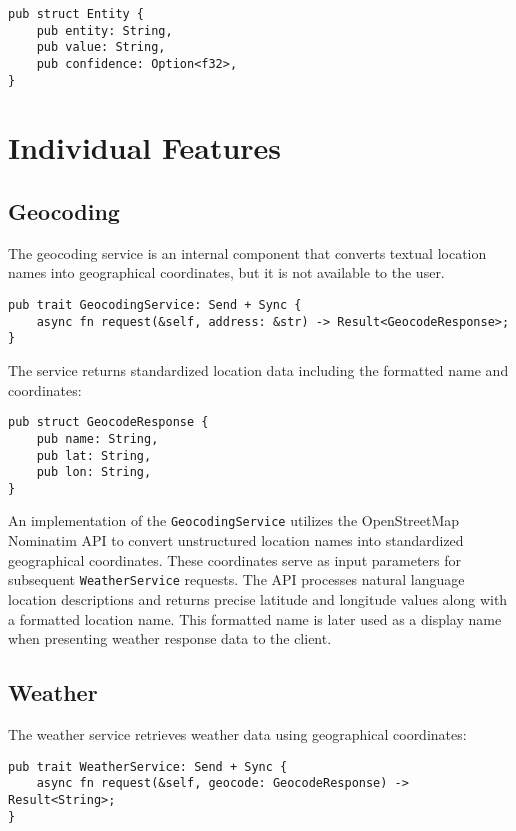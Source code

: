 \begin{verbatim}
pub struct Entity {
    pub entity: String,
    pub value: String,
    pub confidence: Option<f32>,
}
\end{verbatim}

\section{Individual Features}

\subsection{Geocoding}
The geocoding service is an internal component that converts textual location names into geographical coordinates, but it is not available to the user.

\begin{verbatim}
pub trait GeocodingService: Send + Sync {
    async fn request(&self, address: &str) -> Result<GeocodeResponse>;
}
\end{verbatim}

The service returns standardized location data including the formatted name and coordinates:

\begin{verbatim}
pub struct GeocodeResponse {
    pub name: String,
    pub lat: String,
    pub lon: String,
}
\end{verbatim}

An implementation of the \texttt{GeocodingService} utilizes the OpenStreetMap Nominatim API
to convert unstructured location names into standardized geographical coordinates.
These coordinates serve as input parameters for subsequent \texttt{WeatherService} requests.
The API processes natural language location descriptions and returns precise latitude and longitude values along with a formatted location name.
This formatted name is later used as a display name when presenting weather response data to the client.

\subsection{Weather}
The weather service retrieves weather data using geographical coordinates:

\begin{verbatim}
pub trait WeatherService: Send + Sync {
    async fn request(&self, geocode: GeocodeResponse) -> Result<String>;
}
\end{verbatim}

